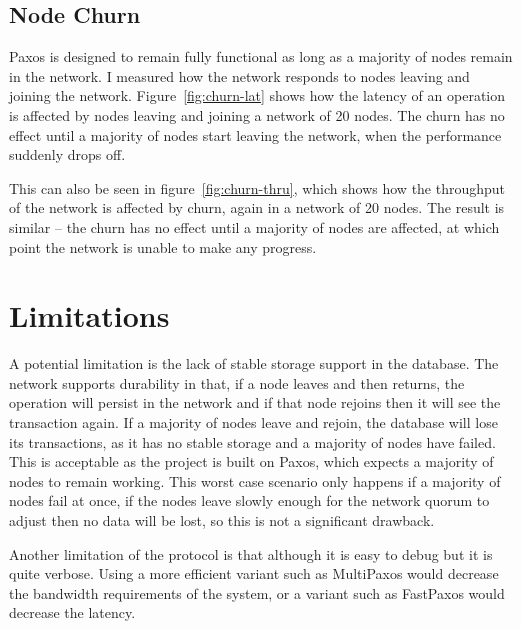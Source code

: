 \documentclass[12pt,twoside,notitlepage]{report}
\begin{document}
\subsection{Node Churn}

\begin{figure}[Hhtb]
\centering
{}
\end{figure}

Paxos is designed to remain fully functional as long as a majority of nodes remain in the network.
I measured how the network responds to nodes leaving and joining the network.
Figure~\ref{fig:churn-lat} shows how the latency of an operation is affected by nodes leaving and
joining a network of 20 nodes. The churn has no effect until a majority of nodes start leaving the
network, when the performance suddenly drops off.

This can also be seen in figure~\ref{fig:churn-thru}, which shows how the throughput of the
network is affected by churn, again in a network of 20 nodes. The result is similar -- the churn
has no effect until a majority of nodes are affected, at which point the network is unable to make
any progress.

\section{Limitations}

A potential limitation is the lack of stable storage support in the database. The network supports
durability in that, if a node leaves and then returns, the operation will persist in the network
and if that node rejoins then it will see the transaction again. If a majority of nodes leave and
rejoin, the database will lose its transactions, as it has no stable storage and a majority of
nodes have failed. This is acceptable as the project is built on Paxos, which expects a majority
of nodes to remain working. This worst case scenario only happens if a majority of nodes fail at
once, if the nodes leave slowly enough for the network quorum to adjust then no data will be lost,
so this is not a significant drawback.

Another limitation of the protocol is that although it is easy to debug but it is quite verbose.
Using a more efficient variant such as MultiPaxos would decrease the bandwidth requirements of the
system, or a variant such as FastPaxos would decrease the latency.
\end{document}
